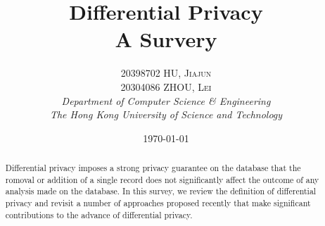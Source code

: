 \documentclass[a4paper, 11pt]{article} %
\makeatletter
\renewcommand{\maketitle}{ %
\begin{flushright} %
{\LARGE\@title} %

\vspace{50pt} %

{\large\@author} %
\\\@date %

\vspace{40pt} %
\end{flushright}
}
\makeatother
\begin{document}

\title{\textbf{Differential Privacy}\\ %
A Survery} %

\author{\textsc{20398702 HU, Jiajun \\ 20304086 ZHOU, Lei} %
\\{\textit{Department of Computer Science \& Engineering \\ The Hong Kong University of Science and Technology}}} %

\date{\today} %



\maketitle %



\begin{abstract}
Differential privacy imposes a strong privacy guarantee on the database that the romoval or addition of a single record does not significantly affect the outcome of any analysis made on the database. In this survey, we review the definition of differential privacy and revisit a number of approaches proposed recently that make significant contributions to the advance of differential privacy.
\end{abstract}


\vspace{30pt} %

\end{document}
